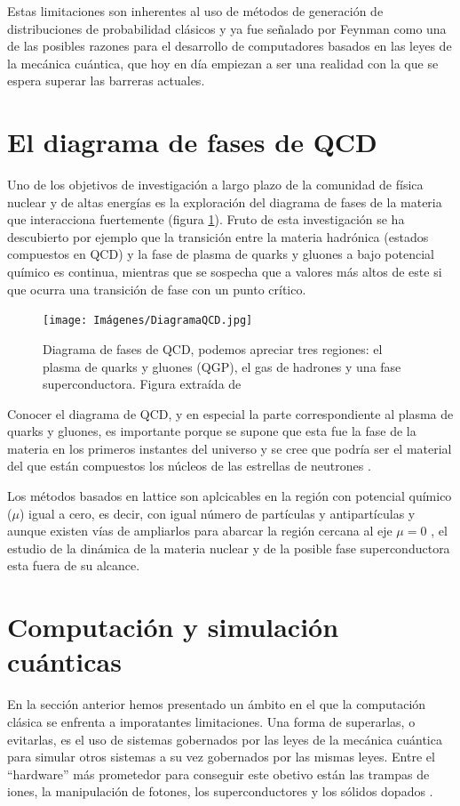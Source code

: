 \documentclass[a4paper,10pt]{article}
\begin{document}
\begin{multicols}{2}
Estas limitaciones son inherentes al uso de métodos de generación de distribuciones de probabilidad clásicos y ya fue señalado por Feynman \cite{feynman_simulating_1982} como una de las posibles razones para el desarrollo de computadores basados en las leyes de la mecánica cuántica, que hoy en día empiezan a ser una realidad con la que se espera superar las barreras actuales.

\section{El diagrama de fases de QCD}
Uno de los objetivos de investigación a largo plazo de la comunidad de física nuclear y de altas energías es la exploración del diagrama de fases de la materia que interacciona fuertemente (figura \ref{QCDphase}). Fruto de esta investigación se ha descubierto por ejemplo que la transición entre la materia hadrónica (estados compuestos en QCD) y la fase de plasma de quarks y gluones a bajo potencial químico es continua, mientras que se sospecha que a valores más altos de este si que ocurra una transición de fase con un punto crítico.

\begin{figure}[H]
\begin{center}
\texttt{[image: Imágenes/DiagramaQCD.jpg]}
\end{center}
\caption{Diagrama de fases de QCD, podemos apreciar tres regiones: el plasma de quarks y gluones (QGP), el gas de hadrones y una fase superconductora. Figura extraída de \cite{usqcd_collaboration_hot-dense_2019}}
\label{QCDphase}
\end{figure}

Conocer el diagrama de QCD, y en especial la parte correspondiente al plasma de quarks y gluones, es importante porque se supone que esta fue la fase de la materia en los primeros instantes del universo y se cree que podría ser el material del que están compuestos los núcleos de las estrellas de neutrones \cite{busza_heavy_2018}.

Los métodos basados en lattice son aplcicables en la región con potencial químico ($\mu$) igual a cero, es decir, con igual número de partículas y antipartículas y aunque existen vías de ampliarlos para abarcar la región cercana al eje $\mu=0$ \cite{usqcd_collaboration_hot-dense_2019}, el estudio de la dinámica de la materia nuclear y de la posible fase superconductora esta fuera de su alcance.

\section{Computación y simulación cuánticas}
En la sección anterior hemos presentado un ámbito en el que la computación clásica se enfrenta a imporatantes limitaciones. Una forma de superarlas, o evitarlas, es el uso de sistemas gobernados por las leyes de la mecánica cuántica para simular otros sistemas a su vez gobernados por las mismas leyes. Entre el ``hardware'' más prometedor para conseguir este obetivo están las trampas de iones, la manipulación de fotones, los superconductores y los sólidos dopados \cite{ladd_quantum_2010}.


\end{multicols}
\end{document}
